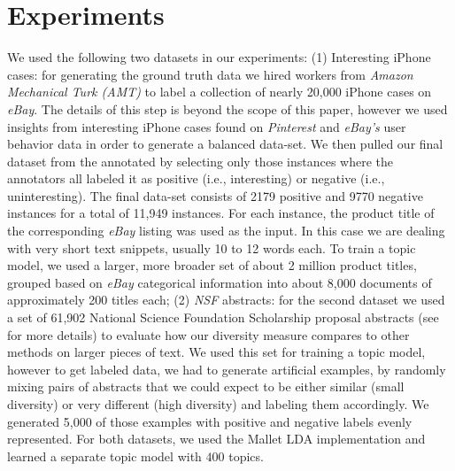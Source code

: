\documentclass{article} %
\begin{document}

\section{Experiments}
\label{sec:experiments}

We used the following two datasets in our experiments: (1) Interesting iPhone cases:
for generating the ground truth data we hired workers from {\em Amazon Mechanical Turk (AMT)} to label a collection
of nearly 20,000 iPhone cases on {\em eBay}. The details of this step is beyond the scope of this paper, however we used insights from
interesting iPhone cases found on {\em Pinterest} and {\em eBay's} user behavior data in order to generate a balanced data-set. 
We then pulled our final dataset from the annotated by selecting only those instances where the annotators all labeled it as
positive (i.e., interesting) or negative (i.e., uninteresting). The final data-set consists of 2179 positive and 9770 negative instances for
a total of 11,949 instances. For each instance, the product title of
the corresponding {\em eBay} listing was used as the input. In this case we are
dealing with very short text snippets, usually 10 to 12 words each. To
train a topic model, we used a larger, more broader set of about
2 million product titles, grouped based on {\em eBay} categorical information into about 8,000
documents of approximately 200 titles each; (2) {\em NSF}
abstracts: for the second dataset we used a set of 61,902 National Science Foundation
Scholarship proposal abstracts (see~\cite{bache:2013} for more details) to evaluate how our diversity measure
compares to other methods on larger pieces of text. We used this set
for training a topic model, however to get labeled data, we had to
generate artificial examples, by randomly mixing pairs of abstracts that we
could expect to be either similar (small diversity) or very different
(high diversity) and labeling them accordingly. We generated 5,000 of
those examples with positive and negative labels evenly represented. For both datasets, we used the Mallet LDA implementation and learned a separate topic model with $400$ topics.
\end{document}
